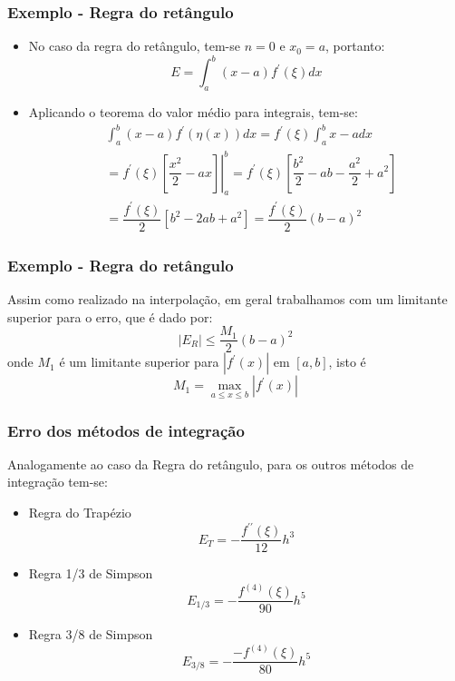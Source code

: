 \documentclass{beamer}
\theoremstyle{mystyle}
\begin{document}
	\begin{frame}
		\frametitle{Exemplo - Regra do retângulo}
		\begin{itemize}
			\item  No caso da regra do retângulo, tem-se $ n = 0 $ e $ x_{0} = a $, portanto:
			\begin{equation*}
				E = \int_{a}^{b} (x - a)f^{\prime}(\xi) dx
			\end{equation*}
			\item Aplicando o teorema do valor médio para integrais, tem-se:
			\begin{align*}
				&\int_{a}^{b} (x - a)f^{\prime}(\eta(x)) dx = f^{\prime}(\xi)\int_{a}^{b} x - a dx \\
				& =  f^{\prime}(\xi)\left. \left[ \dfrac{x^{2}}{2} - ax\right] \right|_{a}^{b} = f^{\prime}(\xi) \left[ \dfrac{b^{2}}{2} - ab - \dfrac{a^{2}}{2} + a^{2}\right]\\
				& = \dfrac{f^{\prime}(\xi)}{2} \left[ b^{2} - 2ab + a^{2}\right] = \dfrac{f^{\prime}(\xi)}{2}(b - a)^{2}
			\end{align*}
		\end{itemize}
	\end{frame}

	\begin{frame}
		\frametitle{Exemplo - Regra do retângulo}
		Assim como realizado na interpolação, em geral trabalhamos com um limitante superior para o erro, que é dado por:
		\begin{equation*}
		 |E_{R}| \leq \dfrac{M_{1}}{2}(b - a)^{2}
		\end{equation*}
		onde $ M_{1} $ é um limitante superior para $ |f^{\prime}(x)| $ em $ [a,b] $, isto é
		\begin{equation*}
			M_{1} = \max_{a \leq x \leq b}  |f^{\prime}(x)|
		\end{equation*}
	\end{frame}
	
	\begin{frame}
		\frametitle{Erro dos métodos de integração}
		Analogamente ao caso da Regra do retângulo, para os outros métodos de integração tem-se:
		\begin{itemize}
			\item Regra do Trapézio
			\begin{equation*}
				E_{T} = -\dfrac{f^{\prime\prime}(\xi)}{12}h^{3}
			\end{equation*}
			\item Regra 1/3 de Simpson
			\begin{equation*}
				E_{1/3} = -\dfrac{f^{(4)}(\xi)}{90}h^{5}
			\end{equation*}
			\item Regra 3/8 de Simpson
			\begin{equation*}
				E_{3/8} = -\dfrac{-f^{(4)}(\xi)}{80}h^{5}
			\end{equation*}
		\end{itemize}
	\end{frame}
\end{document}
